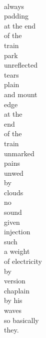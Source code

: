 \documentclass[smalldemyvopaper,11pt,twoside,onecolumn,openright,extrafontsizes]{memoir}
\begin{document}
\\always
\\padding
\\at the end
\\of the
\\train
\\park
\\unreflected
\\tears
\\plain
\\and mount
\\edge
\\at the
\\end
\\of the
\\train
\\unmarked
\\pains
\\unwed
\\by
\\clouds
\\no
\\sound
\\given
\\injection
\\such
\\a weight
\\of electricity
\\by
\\version
\\chaplain
\\by his
\\waves
\\so basically
\\they.
\end{document}

